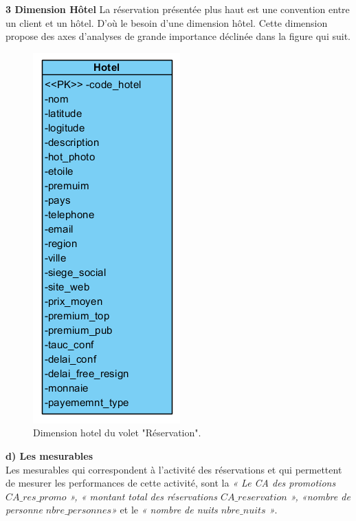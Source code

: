 \textbf{3 Dimension Hôtel}
La réservation présentée plus haut est une convention entre un client et un hôtel. D’où le besoin d’une dimension hôtel. Cette dimension propose des axes d'analyses de grande importance déclinée dans la figure qui suit.
\cleardoublepage
\begin{figure}[!htbp]
	\begin{center}
		\includegraphics[scale=0.65]{images/dim_hotel.png}
		\caption{Dimension hotel du volet "Réservation".}
		\label{use_bi_tools}
	\end{center}
\end{figure}


\textbf{d) Les mesurables}\\
Les mesurables qui correspondent à l’activité des réservations et qui permettent de mesurer les performances de cette activité, sont la \textit{« Le CA des promotions \(CA\_res\_promo\) », « montant total des réservations \(CA\_reservation\) », «nombre de personne \(nbre\_personnes\)»}  et le \textit{« nombre de nuits \(nbre\_nuits\) »}.

